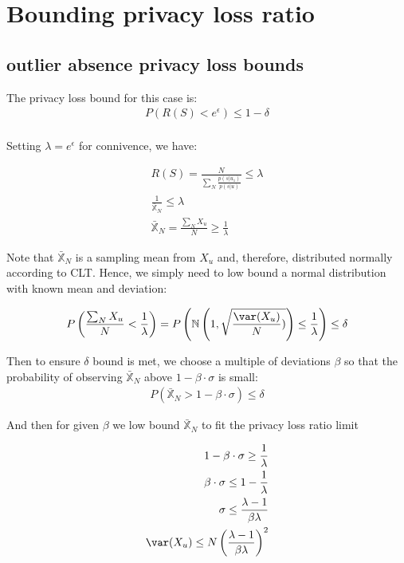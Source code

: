 \documentclass[11pt]{article}
\begin{document}
\section{Bounding privacy loss ratio}

\subsection{outlier absence privacy loss bounds}

The privacy loss bound for this case is:
\begin{align}
P(R(S) < e^{\epsilon} ) \le 1 - \delta \\ 
\end{align}

Setting $\lambda = e^{\epsilon}$ for connivence, we have:
 
 \begin{align}
R(S) =  \frac{N}{\sum_N  \frac{ p(s | u_1) } { p(s | u) }}  \le  \lambda \\
\frac{1}{\bar{\mathbb{X}}_N} \le \lambda \\
\bar{\mathbb{X}}_N = \frac{\sum_N X_u}{N} \ge \frac{1}{\lambda}
\end{align}

Note that $\bar{\mathbb{X}}_N$ is a sampling mean from $X_u$ and, therefore, distributed normally according to CLT.   Hence, we simply need to low bound a normal distribution with known mean and deviation:

\begin{align}
P \left (\frac{ \sum_N X_u}{N} <  \frac{1}{\lambda} \right ) = P  \left (  \mathbb{N} \left ( 1, \sqrt{\frac{\var(X_u)}{N})} \right ) \le   \frac{1}{\lambda} \right ) \le \delta
\end{align}

Then to ensure $\delta$ bound is met, we choose  a multiple of deviations $\beta$ so that  the probability of observing $\bar{\mathbb{X}}_N$ above $1 -  \beta \cdot \sigma$ is small:
\begin{align}
P (\bar{\mathbb{X}}_N > 1 - \beta \cdot \sigma) \le \delta
\end{align}

And then for given $\beta$ we low bound  $\bar{\mathbb{X}}_N$  to fit the privacy loss ratio limit

\begin{align}
1 - \beta \cdot \sigma \ge  \frac{1}{\lambda} \\
 \beta \cdot \sigma \le 1 -  \frac{1}{\lambda} \\
\sigma \le \frac{\lambda - 1}{\beta\lambda} \\
\var(X_u) \le N \left ( \frac{\lambda - 1}{\beta\lambda} \right )^2 \\
\end{align}
\end{document}
